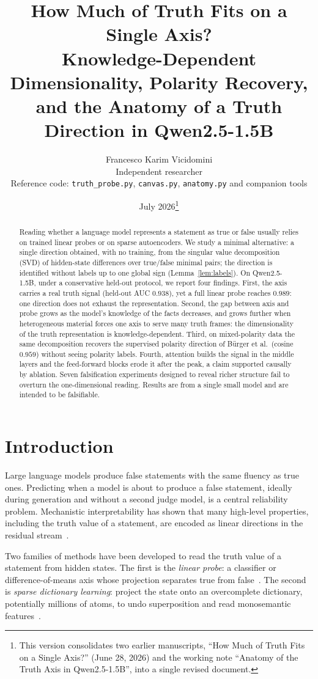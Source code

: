 \documentclass[11pt]{article}
\title{\textbf{How Much of Truth Fits on a Single Axis?}\\[2pt]
\large Knowledge-Dependent Dimensionality, Polarity Recovery,\\
and the Anatomy of a Truth Direction in Qwen2.5-1.5B}
\author{Francesco Karim Vicidomini\\
\small Independent researcher\\
\small Reference code: \texttt{truth\_probe.py}, \texttt{canvas.py}, \texttt{anatomy.py} and companion tools}
\date{July 2026\thanks{This version consolidates two earlier
manuscripts, ``How Much of Truth Fits on a Single Axis?'' (June 28, 2026) and
the working note ``Anatomy of the Truth Axis in Qwen2.5-1.5B'', into a single
revised document.}}
\begin{document}
\maketitle

\begin{abstract}
Reading whether a language model represents a statement as true or false
usually relies on trained linear probes or on sparse autoencoders. We study a
minimal alternative: a single direction obtained, with no training, from the
singular value decomposition (SVD) of hidden-state differences over
true/false minimal pairs; the direction is identified without labels up to
one global sign (Lemma~\ref{lem:labels}). On Qwen2.5-1.5B, under a
conservative held-out protocol, we report four findings. First, the axis
carries a real truth signal (held-out AUC $0.938$), yet a full linear probe
reaches $0.989$: one direction does not exhaust the representation. Second,
the gap between axis and probe grows as the model's knowledge of the facts
decreases, and grows further when heterogeneous material forces one axis to
serve many truth frames: the dimensionality of the truth representation is
knowledge-dependent. Third, on mixed-polarity data the same decomposition
recovers the supervised polarity direction of B\"urger et al.\ (cosine
$0.959$) without seeing polarity labels. Fourth, attention builds the signal
in the middle layers and the feed-forward blocks erode it after the peak, a
claim supported causally by ablation. Seven falsification experiments
designed to reveal richer structure fail to overturn the one-dimensional
reading. Results are from a single small model and are intended to be
falsifiable.
\end{abstract}

\section{Introduction}

Large language models produce false statements with the same fluency as true
ones. Predicting when a model is about to produce a false statement, ideally
during generation and without a second judge model, is a central reliability
problem. Mechanistic interpretability has shown that many high-level
properties, including the truth value of a statement, are encoded as linear
directions in the residual stream~\cite{marks2024,zou2023}.

Two families of methods have been developed to read the truth value of a
statement from hidden states. The first is the \emph{linear probe}: a
classifier or difference-of-means axis whose projection separates true from
false~\cite{burns2023,marks2024,li2023}. The second is \emph{sparse dictionary
learning}: project the state onto an overcomplete dictionary, potentially
millions of atoms, to undo superposition and read monosemantic
features~\cite{cunningham2023,bricken2023}.
\end{document}
